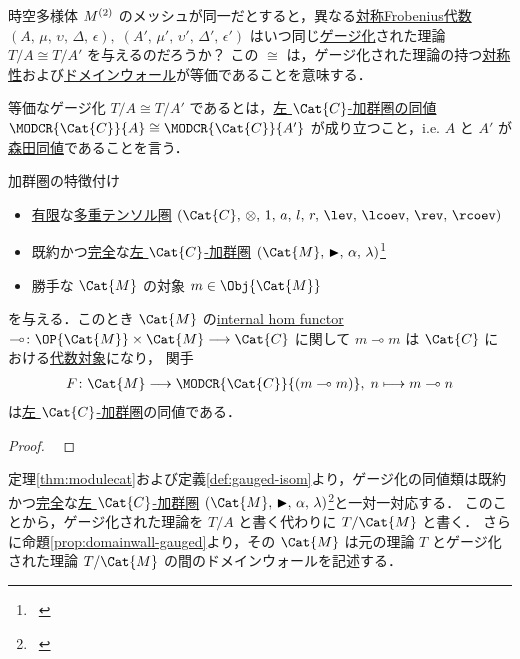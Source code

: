 \documentclass[TQFT_main]{subfiles}
\begin{document}
時空多様体 $M^{(2)}$ のメッシュが同一だとすると，異なる\hyperref[def:sym-Frobenius]{対称Frobenius代数} $(A,\, \mu,\, \upsilon,\, \Delta,\, \epsilon),\; (A',\, \mu',\, \upsilon',\, \Delta',\, \epsilon')$ はいつ同じ\hyperref[def:gauging]{ゲージ化}された理論 $T/A \cong T/A'$ を与えるのだろうか？
この $\cong$ は，ゲージ化された理論の持つ\hyperref[ax:symcat-2d-0form]{対称性}および\hyperref[prop:domainwall-gauged]{ドメインウォール}が等価であることを意味する．

\begin{mydefph}[label=def:gauged-isom]{等価なゲージ化}
    $T/A \cong T/A'$ であるとは，\hyperref[def:tensor-functor]{左 $\Cat{C}$-加群圏の同値} $\MODCR{\Cat{C}}{A} \cong \MODCR{\Cat{C}}{A'}$ が成り立つこと，i.e. $A$ と $A'$ が\hyperref[def:Morita-equiv]{森田同値}であることを言う．
\end{mydefph}

\begin{mytheo}[label=thm:modulecat]{加群圏の特徴付け}
    \begin{itemize}
        \item \hyperref[def:finite-abcat]{有限}な\hyperref[def:tenosrfusion-cat]{多重テンソル圏} $(\Cat{C},\, \otimes,\, 1,\, a,\, l,\, r,\, \lev,\, \lcoev,\, \rev,\, \rcoev)$
        \item 既約かつ\hyperref[def:modulecat-exact]{完全}な\hyperref[def:modulecat]{左 $\Cat{C}$-加群圏} $(\Cat{M},\, \btr,\, \alpha,\, \lambda)$\footnote{~\cite[p.152]{etingof2015tensor}}
        \item 勝手な $\Cat{M}$ の対象 $m \in \Obj{\Cat{M}}$
    \end{itemize}
    を与える．このとき $\Cat{M}$ の\hyperref[def:internal-hom]{internal hom functor} $\multimap \colon \OP{\Cat{M}} \times \Cat{M} \lto \Cat{C}$ に関して $m \multimap m$ は $\Cat{C}$ における\hyperref[def:algobj]{代数対象}になり，
    関手
    \begin{align}
        F \colon \Cat{M} \lto \MODCR{\Cat{C}}{(m \multimap m)},\; n \lmto m \multimap n
    \end{align}
    は\hyperref[def:modulecat]{左 $\Cat{C}$-加群圏}の同値である．

\end{mytheo}

\begin{proof}
    ~\cite[THEOREM7.10.1, p.150]{etingof2015tensor}
\end{proof}

定理\ref{thm:modulecat}および定義\ref{def:gauged-isom}より，ゲージ化の同値類は既約かつ\hyperref[def:modulecat-exact]{完全}な\hyperref[def:modulecat]{左 $\Cat{C}$-加群圏} $(\Cat{M},\, \btr,\, \alpha,\, \lambda)$\footnote{~\cite[p.152]{etingof2015tensor}}と一対一対応する．
このことから，ゲージ化された理論を $T/A$ と書く代わりに $T/\Cat{M}$ と書く．
さらに命題\ref{prop:domainwall-gauged}より，その $\Cat{M}$ は元の理論 $T$ とゲージ化された理論 $T/\Cat{M}$ の間のドメインウォールを記述する．
\end{document}
